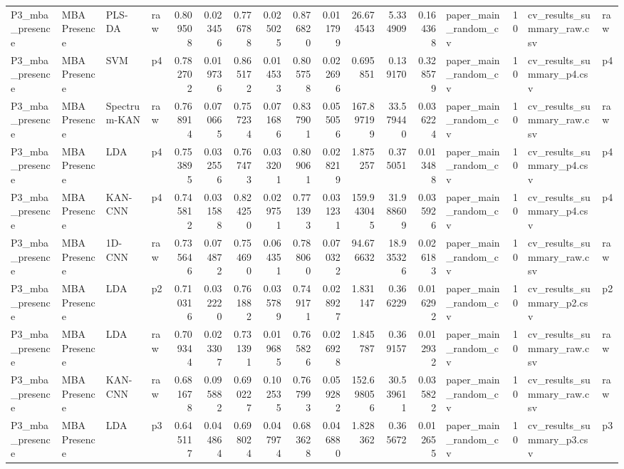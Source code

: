 \begin{tabular}{llllrrrrrrrrrlrll}
P3_mba_presence & MBA Presence & PLS-DA & raw & 0.809508 & 0.023456 & 0.776788 & 0.025025 & 0.876820 & 0.011799 & 26.674543 & 5.334909 & 0.164368 & paper_main_random_cv & 10 & cv_results_summary_raw.csv & raw \\
P3_mba_presence & MBA Presence & SVM & p4 & 0.782702 & 0.019736 & 0.865172 & 0.014533 & 0.805758 & 0.022696 & 0.695851 & 0.139170 & 0.328579 & paper_main_random_cv & 10 & cv_results_summary_p4.csv & p4 \\
P3_mba_presence & MBA Presence & Spectrum-KAN & raw & 0.768914 & 0.070665 & 0.757234 & 0.071686 & 0.837901 & 0.055056 & 167.897199 & 33.579440 & 0.036224 & paper_main_random_cv & 10 & cv_results_summary_raw.csv & raw \\
P3_mba_presence & MBA Presence & LDA & p4 & 0.753895 & 0.032556 & 0.767473 & 0.033201 & 0.809061 & 0.028219 & 1.875257 & 0.375051 & 0.013488 & paper_main_random_cv & 10 & cv_results_summary_p4.csv & p4 \\
P3_mba_presence & MBA Presence & KAN-CNN & p4 & 0.745812 & 0.031588 & 0.824250 & 0.029751 & 0.771393 & 0.031231 & 159.943045 & 31.988609 & 0.035926 & paper_main_random_cv & 10 & cv_results_summary_p4.csv & p4 \\
P3_mba_presence & MBA Presence & 1D-CNN & raw & 0.735646 & 0.074872 & 0.754690 & 0.064351 & 0.788060 & 0.070322 & 94.676632 & 18.935326 & 0.026183 & paper_main_random_cv & 10 & cv_results_summary_raw.csv & raw \\
P3_mba_presence & MBA Presence & LDA & p2 & 0.710316 & 0.032220 & 0.761882 & 0.035789 & 0.749171 & 0.028927 & 1.831147 & 0.366229 & 0.016292 & paper_main_random_cv & 10 & cv_results_summary_p2.csv & p2 \\
P3_mba_presence & MBA Presence & LDA & raw & 0.709344 & 0.023307 & 0.731391 & 0.019685 & 0.765826 & 0.026928 & 1.845787 & 0.369157 & 0.012932 & paper_main_random_cv & 10 & cv_results_summary_raw.csv & raw \\
P3_mba_presence & MBA Presence & KAN-CNN & raw & 0.681678 & 0.095882 & 0.690227 & 0.102535 & 0.767993 & 0.059282 & 152.698056 & 30.539611 & 0.035822 & paper_main_random_cv & 10 & cv_results_summary_raw.csv & raw \\
P3_mba_presence & MBA Presence & LDA & p3 & 0.645117 & 0.044864 & 0.698024 & 0.047974 & 0.683628 & 0.046880 & 1.828362 & 0.365672 & 0.012655 & paper_main_random_cv & 10 & cv_results_summary_p3.csv & p3 \\
\bottomrule
\end{tabular}
